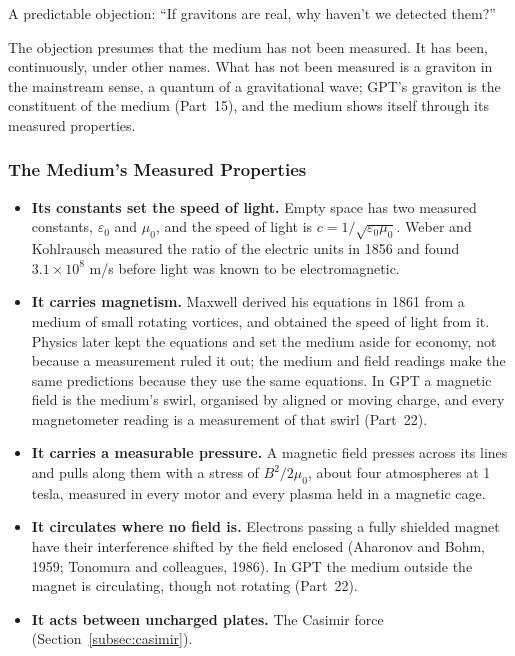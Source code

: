\documentclass[12pt, a4paper]{article}
\begin{document}
A predictable objection: ``If gravitons are real, why haven't we detected them?''

The objection presumes that the medium has not been measured. It has been, continuously, under other names. What has not been measured is a graviton in the mainstream sense, a quantum of a gravitational wave; GPT's graviton is the constituent of the medium (Part~15), and the medium shows itself through its measured properties.

\subsubsection{The Medium's Measured Properties}

\begin{itemize}
    \item \textbf{Its constants set the speed of light.} Empty space has two measured constants, \( \varepsilon_0 \) and \( \mu_0 \), and the speed of light is \( c = 1/\sqrt{\varepsilon_0\mu_0} \). Weber and Kohlrausch measured the ratio of the electric units in 1856 and found \( 3.1\times10^{8} \) m/s before light was known to be electromagnetic.
    \item \textbf{It carries magnetism.} Maxwell derived his equations in 1861 from a medium of small rotating vortices, and obtained the speed of light from it. Physics later kept the equations and set the medium aside for economy, not because a measurement ruled it out; the medium and field readings make the same predictions because they use the same equations. In GPT a magnetic field is the medium's swirl, organised by aligned or moving charge, and every magnetometer reading is a measurement of that swirl (Part~22).
    \item \textbf{It carries a measurable pressure.} A magnetic field presses across its lines and pulls along them with a stress of \( B^2/2\mu_0 \), about four atmospheres at 1 tesla, measured in every motor and every plasma held in a magnetic cage.
    \item \textbf{It circulates where no field is.} Electrons passing a fully shielded magnet have their interference shifted by the field enclosed (Aharonov and Bohm, 1959; Tonomura and colleagues, 1986). In GPT the medium outside the magnet is circulating, though not rotating (Part~22).
    \item \textbf{It acts between uncharged plates.} The Casimir force (Section~\ref{subsec:casimir}).
\end{itemize}
\end{document}

